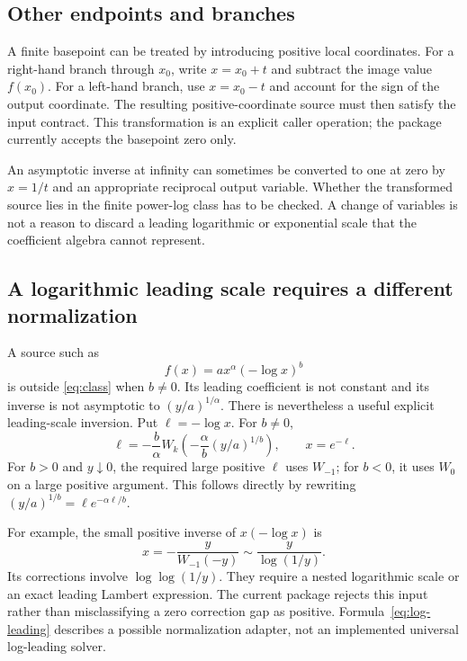 \documentclass[11pt,a4paper]{article}
\numberwithin{equation}{section}
\theoremstyle{definition}\newtheorem{definition}[theorem]{Definition}
\theoremstyle{remark}\newtheorem{remark}[theorem]{Remark}
\begin{document}
\subsection{Other endpoints and branches}
A finite basepoint can be treated by introducing positive local coordinates.
For a right-hand branch through \(x_0\), write \(x=x_0+t\) and subtract the
image value \(f(x_0)\). For a left-hand branch, use \(x=x_0-t\) and account
for the sign of the output coordinate. The resulting positive-coordinate
source must then satisfy the input contract. This transformation is an
explicit caller operation; the package currently accepts the basepoint
zero only.

An asymptotic inverse at infinity can sometimes be converted to one at zero
by \(x=1/t\) and an appropriate reciprocal output variable. Whether the
transformed source lies in the finite power-log class has to be checked.
A change of variables is not a reason to discard a leading logarithmic or
exponential scale that the coefficient algebra cannot represent.

\subsection{A logarithmic leading scale requires a different normalization}
A source such as
\[
 f(x)=a x^\alpha(-\log x)^b
\]
is outside \eqref{eq:class} when \(b\ne0\). Its leading coefficient is not
constant and its inverse is not asymptotic to \((y/a)^{1/\alpha}\).
There is nevertheless a useful explicit leading-scale inversion. Put
\(\ell=-\log x\). For \(b\ne0\),
\begin{equation}\label{eq:log-leading}
 \ell=-\frac b\alpha
 W_k\!\left(-\frac\alpha b(y/a)^{1/b}\right),
 \qquad x=e^{-\ell}.
\end{equation}
For \(b>0\) and \(y\downarrow0\), the required large positive \(\ell\)
uses \(W_{-1}\); for \(b<0\), it uses \(W_0\) on a large positive argument.
This follows directly by rewriting
\((y/a)^{1/b}=\ell e^{-\alpha\ell/b}\).

For example, the small positive inverse of \(x(-\log x)\) is
\[
 x=-\frac{y}{W_{-1}(-y)}
 \sim\frac{y}{\log(1/y)}.
\]
Its corrections involve \(\log\log(1/y)\). They require a nested logarithmic
scale or an exact leading Lambert expression. The current package rejects
this input rather than misclassifying a zero correction gap as positive.
Formula~\eqref{eq:log-leading} describes a possible normalization adapter,
not an implemented universal log-leading solver.
\end{document}
